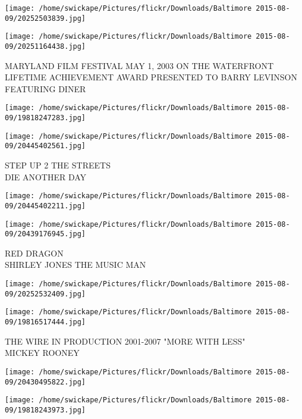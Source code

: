 \documentclass[10pt,letterpaper]{article}
\begin{document}
\texttt{[image: /home/swickape/Pictures/flickr/Downloads/Baltimore 2015-08-09/20252503839.jpg]}

\vspace{0.25in}
\texttt{[image: /home/swickape/Pictures/flickr/Downloads/Baltimore 2015-08-09/20251164438.jpg]}

MARYLAND FILM FESTIVAL MAY 1, 2003 ON THE WATERFRONT\\
LIFETIME ACHIEVEMENT AWARD PRESENTED TO BARRY LEVINSON FEATURING DINER\\
\pagebreak

\texttt{[image: /home/swickape/Pictures/flickr/Downloads/Baltimore 2015-08-09/19818247283.jpg]}

\vspace{0.25in}
\texttt{[image: /home/swickape/Pictures/flickr/Downloads/Baltimore 2015-08-09/20445402561.jpg]}

STEP UP 2 THE STREETS\\
DIE ANOTHER DAY\\
\pagebreak

\texttt{[image: /home/swickape/Pictures/flickr/Downloads/Baltimore 2015-08-09/20445402211.jpg]}

\vspace{0.25in}
\texttt{[image: /home/swickape/Pictures/flickr/Downloads/Baltimore 2015-08-09/20439176945.jpg]}

RED DRAGON\\
SHIRLEY JONES THE MUSIC MAN\\
\pagebreak

\texttt{[image: /home/swickape/Pictures/flickr/Downloads/Baltimore 2015-08-09/20252532409.jpg]}

\vspace{0.25in}
\texttt{[image: /home/swickape/Pictures/flickr/Downloads/Baltimore 2015-08-09/19816517444.jpg]}

THE WIRE IN PRODUCTION 2001{-}2007 "MORE WITH LESS"\\
MICKEY ROONEY\\
\pagebreak

\texttt{[image: /home/swickape/Pictures/flickr/Downloads/Baltimore 2015-08-09/20430495822.jpg]}

\vspace{0.25in}
\texttt{[image: /home/swickape/Pictures/flickr/Downloads/Baltimore 2015-08-09/19818243973.jpg]}
\end{document}
